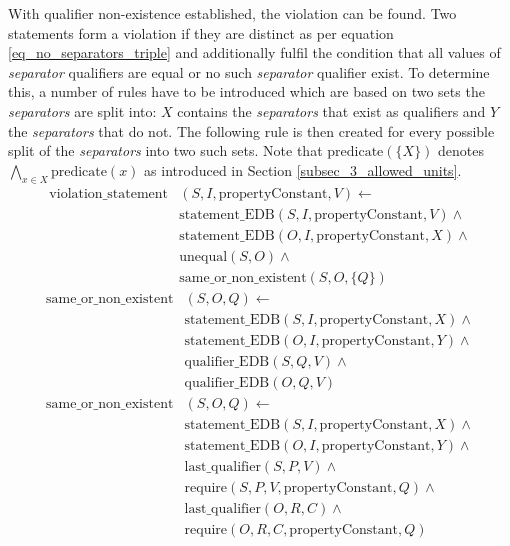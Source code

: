 \documentclass[hyperref,bachelorofscience,fleqn]{cgvpub}
\begin{document}
With qualifier non-existence established, the violation can be found. Two statements form a violation if they are distinct as per equation \ref{eq_no_separators_triple} and additionally fulfil the condition that all values of \emph{separator} qualifiers are equal or no such \emph{separator} qualifier exist. To determine this, a number of rules have to be introduced which are based on two sets the \emph{separators} are split into: \(X\) contains the \emph{separators} that exist as qualifiers and \(Y\) the \emph{separators} that do not. The following rule is then created for every possible split of the \emph{separators} into two such sets. Note that \(\text{predicate}(\{X\})\) denotes \(\bigwedge_{x \in X} \text{predicate}(x)\) as introduced in Section \ref{subsec_3_allowed_units}.
\begin{equation*}
\begin{split}
\text{violation\_statement}&(S, I, \text{propertyConstant}, V) \leftarrow \\
&\text{statement\_EDB}(S, I, \text{propertyConstant}, V) \wedge{} \\
&\text{statement\_EDB}(O, I, \text{propertyConstant}, X) \wedge{} \\
&\text{unequal}(S, O) \wedge{} \\
&\text{same\_or\_non\_existent}(S, O, \{Q\})
\end{split}
\end{equation*}
\begin{equation*}
\begin{split}
\text{same\_or\_non\_existent}&(S, O, Q) \leftarrow \\
&\text{statement\_EDB}(S, I, \text{propertyConstant}, X) \wedge{} \\
&\text{statement\_EDB}(O, I, \text{propertyConstant}, Y) \wedge{} \\
&\text{qualifier\_EDB}(S, Q, V) \wedge{} \\
&\text{qualifier\_EDB}(O, Q, V)
\end{split}
\end{equation*}
\begin{equation*}
\begin{split}
\text{same\_or\_non\_existent}&(S, O, Q) \leftarrow{} \\
&\text{statement\_EDB}(S, I, \text{propertyConstant}, X) \wedge{} \\
&\text{statement\_EDB}(O, I, \text{propertyConstant}, Y) \wedge{} \\
&\text{last\_qualifier}(S, P, V) \wedge{} \\
&\text{require}(S, P, V, \text{propertyConstant}, Q) \wedge{} \\
&\text{last\_qualifier}(O, R, C) \wedge{} \\
&\text{require}(O, R, C, \text{propertyConstant}, Q)
\end{split}
\end{equation*}
\end{document}
